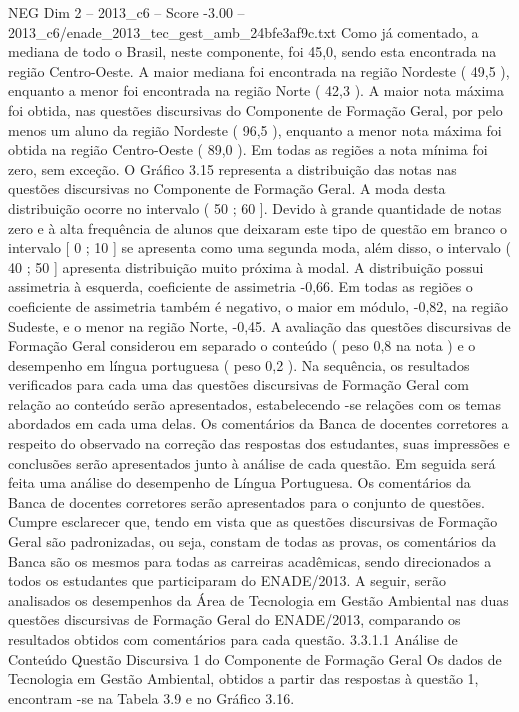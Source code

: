 \begin{textsample}{NEG Dim 2 – 2013\_c6 – Score -3.00 – 2013\_c6/enade\_2013\_tec\_gest\_amb\_24bfe3af9c.txt}
Como já comentado, a mediana de todo o Brasil, neste componente, foi 45,0, sendo esta encontrada na região Centro-Oeste.
A maior mediana foi encontrada na região Nordeste ( 49,5 ), enquanto a menor foi encontrada na região Norte ( 42,3 ).
A maior nota máxima foi obtida, nas questões discursivas do Componente de Formação Geral, por pelo menos um aluno da região Nordeste ( 96,5 ), enquanto a menor nota máxima foi obtida na região Centro-Oeste ( 89,0 ).
Em todas as regiões a nota mínima foi zero, sem exceção.
O Gráfico 3.15 representa a distribuição das notas nas questões discursivas no Componente de Formação Geral.
A moda desta distribuição ocorre no intervalo ( 50 ; 60 ].
Devido à grande quantidade de notas zero e à alta frequência de alunos que deixaram este tipo de questão em branco o intervalo [ 0 ; 10 ] se apresenta como uma segunda moda, além disso, o intervalo ( 40 ; 50 ] apresenta distribuição muito próxima à modal.
A distribuição possui assimetria à esquerda, coeficiente de assimetria -0,66.
Em todas as regiões o coeficiente de assimetria também é negativo, o maior em módulo, -0,82, na região Sudeste, e o menor na região Norte, -0,45.
A avaliação das questões discursivas de Formação Geral considerou em separado o conteúdo ( peso 0,8 na nota ) e o desempenho em língua portuguesa ( peso 0,2 ).
Na sequência, os resultados verificados para cada uma das questões discursivas de Formação Geral com relação ao conteúdo serão apresentados, estabelecendo -se relações com os temas abordados em cada uma delas.
Os comentários da Banca de docentes corretores a respeito do observado na correção das respostas dos estudantes, suas impressões e conclusões serão apresentados junto à análise de cada questão.
Em seguida será feita uma análise do desempenho de Língua Portuguesa.
Os comentários da Banca de docentes corretores serão apresentados para o conjunto de questões.
Cumpre esclarecer que, tendo em vista que as questões discursivas de Formação Geral são padronizadas, ou seja, constam de todas as provas, os comentários da Banca são os mesmos para todas as carreiras acadêmicas, sendo direcionados a todos os estudantes que participaram do ENADE/2013.
A seguir, serão analisados os desempenhos da Área de Tecnologia em Gestão Ambiental nas duas questões discursivas de Formação Geral do ENADE/2013, comparando os resultados obtidos com comentários para cada questão. 3.3.1.1 Análise de Conteúdo Questão Discursiva 1 do Componente de Formação Geral Os dados de Tecnologia em Gestão Ambiental, obtidos a partir das respostas à questão 1, encontram -se na Tabela 3.9 e no Gráfico 3.16.

\end{textsample}
